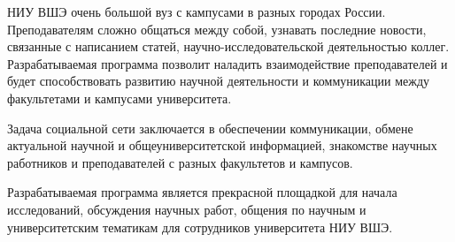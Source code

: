 
НИУ ВШЭ очень большой вуз с кампусами в разных городах России. Преподавателям сложно общаться между собой, узнавать последние новости, связанные с написанием статей, научно-исследовательской деятельностью коллег. Разрабатываемая программа позволит наладить взаимодействие преподавателей и будет способствовать развитию научной деятельности и коммуникации между факультетами и кампусами университета.

Задача социальной сети заключается в обеспечении коммуникации, обмене актуальной научной и общеуниверситетской информацией, знакомстве научных работников и преподавателей с разных факультетов и кампусов. 

Разрабатываемая программа является прекрасной площадкой для начала исследований, обсуждения научных работ, общения по научным и университетским тематикам для сотрудников университета НИУ ВШЭ.